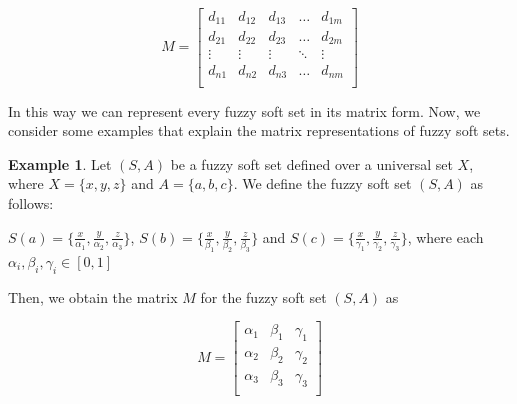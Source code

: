 \documentclass{article}
\theoremstyle{definition}
\newtheorem{example}{Example}[section]
\begin{document}
    \begin{center}
    \[
    M=
    \begin{bmatrix}
           d_{11} & d_{12} & d_{13} & \dots & d_{1m}\\
         d_{21} & d_{22} & d_{23} & \dots & d_{2m}\\
        \vdots & \vdots & \vdots & \ddots & \vdots\\
      d_{n1} & d_{n2} & d_{n3} & \dots & d_{nm}\\
     \end{bmatrix}
     \]
     \end{center}
     
    
    
     
     In this way we can represent every fuzzy soft set in its matrix form. Now, we consider some examples that explain the matrix representations of fuzzy soft sets.

  \begin{example}
      Let $(S,A)$ be a fuzzy soft set defined over a universal set $X$, where $X=\{x, y, z\}$ and $A=\{a, b, c\}$. We define the fuzzy soft set $(S,A)$ as follows:

     $S(a)=\{\frac{x}{{\alpha}_1}, \frac{y}{{\alpha}_2}, \frac{z}{{\alpha}_3}\}$, $S(b)=\{\frac{x}{{\beta}_1}, \frac{y}{{\beta}_2}, \frac{z}{{\beta}_3}\}$ and $S(c)=\{\frac{x}{{\gamma}_1}, \frac{y}{{\gamma}_2}, \frac{z}{{\gamma}_3}\}$, where each ${\alpha}_i, {\beta}_i, {\gamma}_i \in [0,1]$

     Then, we obtain the matrix $M$ for the fuzzy soft set $(S,A)$ as 

      \begin{center}
    \[
    M=
    \begin{bmatrix}
           {\alpha}_1 & {\beta}_1 & {\gamma}_1\\
         {\alpha}_2 & {\beta}_2 & {\gamma}_2\\
     {\alpha}_3 & {\beta}_3 & {\gamma}_3\\
     \end{bmatrix}
     \]
     \end{center}
    
  \end{example}
\end{document}
